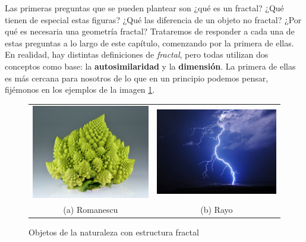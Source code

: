 


Las primeras preguntas que se pueden plantear son ¿qué es un fractal? ¿Qué tienen de especial estas figuras? ¿Qué las diferencia de un objeto no fractal? ¿Por qué es necesaria una geometría fractal? Trataremos de responder a cada una de estas preguntas a lo largo de este capítulo, comenzando por la primera de ellas. En realidad, hay distintas definiciones de \textit{fractal}, pero todas utilizan dos conceptos como base: la \textbf{autosimilaridad} y la \textbf{dimensión}. La primera de ellas es más cercana para nosotros de lo que en un principio podemos pensar, fijémonos en los ejemplos de la imagen \ref{fig:objetos}. 

\begin{figure}[ht]
\begin{tabular}{cc}
  \includegraphics[scale=0.225]{./img/romanescu.jpg} &   \includegraphics[scale=0.2]{./img/rayo.jpg} \\
(a) Romanescu & (b) Rayo \\[6pt]
\end{tabular}
\caption{Objetos de la naturaleza con estructura fractal}
\label{fig:objetos}
\end{figure}

